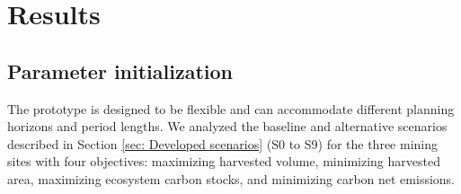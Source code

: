 \documentclass[preprint,12pt]{elsarticle}
\begin{document}
\begin{table}[H]
\caption{Scenarios and applied constraints}
\centering
\label{tab:scenario_constraints}
\end{table}


\section{Results}
\label{sec: Results}
\subsection{Parameter initialization}
\label{sec:Parameter initialization }
The prototype is designed to be flexible and can accommodate different planning horizons and period lengths. We analyzed the baseline and alternative scenarios described in Section \ref{sec: Developed scenarios} (S0 to S9) for the three mining sites with four objectives: maximizing harvested volume, minimizing harvested area, maximizing ecosystem carbon stocks, and minimizing carbon net emissions.
\end{document}
